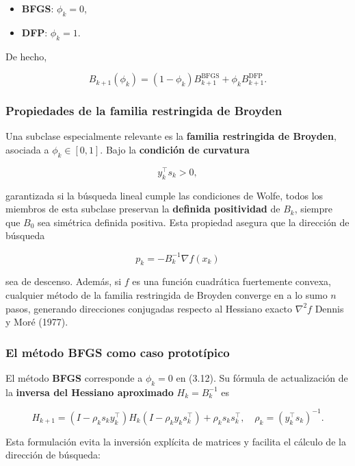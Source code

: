 \documentclass[
  spanish,
  us-letterpaper,
  DIV=11,
  numbers=noendperiod]{scrreprt}
\providecommand{\tightlist}{%
  \setlength{\itemsep}{0pt}\setlength{\parskip}{0pt}}
\numberwithin{equation}{section}
\begin{document}
\begin{itemize}
\tightlist
\item
  \textbf{BFGS}: \(\phi_k = 0\),
\item
  \textbf{DFP}: \(\phi_k = 1\).
\end{itemize}

De hecho,

\[
B_{k+1}(\phi_k) = (1 - \phi_k) B_{k+1}^{\text{BFGS}} + \phi_k B_{k+1}^{\text{DFP}}. \tag{3.14}
\]

\subsubsection{Propiedades de la familia restringida de
Broyden}\label{propiedades-de-la-familia-restringida-de-broyden}

Una subclase especialmente relevante es la \textbf{familia restringida
de Broyden}, asociada a \(\phi_k \in [0,1]\). Bajo la \textbf{condición
de curvatura}

\[
y_k^\top s_k > 0, \tag{3.15}
\]

garantizada si la búsqueda lineal cumple las condiciones de Wolfe, todos
los miembros de esta subclase preservan la \textbf{definida positividad}
de \(B_k\), siempre que \(B_0\) sea simétrica definida positiva. Esta
propiedad asegura que la dirección de búsqueda

\[
p_k = -B_k^{-1} \nabla f(x_k) \tag{3.16}
\]

sea de descenso. Además, si \(f\) es una función cuadrática fuertemente
convexa, cualquier método de la familia restringida de Broyden converge
en a lo sumo \(n\) pasos, generando direcciones conjugadas respecto al
Hessiano exacto \(\nabla^2 f\) Dennis y Moré (1977).

\subsubsection{El método BFGS como caso
prototípico}\label{el-muxe9todo-bfgs-como-caso-prototuxedpico}

El método \textbf{BFGS} corresponde a \(\phi_k = 0\) en (3.12). Su
fórmula de actualización de la \textbf{inversa del Hessiano aproximado}
\(H_k = B_k^{-1}\) es

\[
H_{k+1} = (I - \rho_k s_k y_k^\top) H_k (I - \rho_k y_k s_k^\top) + \rho_k s_k s_k^\top,
\quad \rho_k = (y_k^\top s_k)^{-1}. \tag{3.17}
\]

Esta formulación evita la inversión explícita de matrices y facilita el
cálculo de la dirección de búsqueda:
\end{document}
